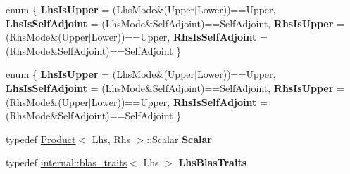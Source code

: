 \begin{DoxyCompactItemize}
\item 
\mbox{\label{struct_eigen_1_1internal_1_1selfadjoint__product__impl_3_01_lhs_00_01_lhs_mode_00_01false_00_01_0e7941e7b3bc2131c413f23ec856f76c_a91eb2245a66bf364573d954a0be0b0c6}} 
enum \{ {\bfseries Lhs\+Is\+Upper} = (Lhs\+Mode\&(Upper$\vert$\+Lower))==Upper, 
{\bfseries Lhs\+Is\+Self\+Adjoint} = (Lhs\+Mode\&Self\+Adjoint)==Self\+Adjoint, 
{\bfseries Rhs\+Is\+Upper} = (Rhs\+Mode\&(Upper$\vert$\+Lower))==Upper, 
{\bfseries Rhs\+Is\+Self\+Adjoint} = (Rhs\+Mode\&Self\+Adjoint)==Self\+Adjoint
 \}
\item 
\mbox{\label{struct_eigen_1_1internal_1_1selfadjoint__product__impl_3_01_lhs_00_01_lhs_mode_00_01false_00_01_0e7941e7b3bc2131c413f23ec856f76c_a9bc24f627f3258f0f50e47d9e5bdf2b2}} 
enum \{ {\bfseries Lhs\+Is\+Upper} = (Lhs\+Mode\&(Upper$\vert$\+Lower))==Upper, 
{\bfseries Lhs\+Is\+Self\+Adjoint} = (Lhs\+Mode\&Self\+Adjoint)==Self\+Adjoint, 
{\bfseries Rhs\+Is\+Upper} = (Rhs\+Mode\&(Upper$\vert$\+Lower))==Upper, 
{\bfseries Rhs\+Is\+Self\+Adjoint} = (Rhs\+Mode\&Self\+Adjoint)==Self\+Adjoint
 \}
\item 
\mbox{\label{struct_eigen_1_1internal_1_1selfadjoint__product__impl_3_01_lhs_00_01_lhs_mode_00_01false_00_01_0e7941e7b3bc2131c413f23ec856f76c_a3d659c239e416d2e9430eb37b9927838}} 
typedef \hyperlink{group___core___module_class_eigen_1_1_product}{Product}$<$ Lhs, Rhs $>$\+::Scalar {\bfseries Scalar}
\item 
\mbox{\label{struct_eigen_1_1internal_1_1selfadjoint__product__impl_3_01_lhs_00_01_lhs_mode_00_01false_00_01_0e7941e7b3bc2131c413f23ec856f76c_a1a2efad3f69a316f6eebf803d8ebe75b}} 
typedef \hyperlink{struct_eigen_1_1internal_1_1blas__traits}{internal\+::blas\+\_\+traits}$<$ Lhs $>$ {\bfseries Lhs\+Blas\+Traits}
\item 

\end{DoxyCompactItemize}
